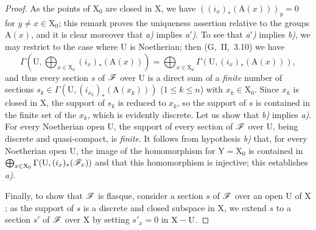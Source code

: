 \begin{proof}
As the points of $\mathrm{X}_0$ are closed in $\mathrm{X}$, we have $((i_x)_*(\mathrm{A}(x)))_y=0$ for $y\neq x\in\mathrm{X}_0$;
this remark proves the uniqueness assertion relative to the groups $\mathrm{A}(x)$, and it is clear moreover that \emph{a)} implies \emph{a$'$)}.
To see that \emph{a$'$)} implies \emph{b)}, we may restrict to the case where $\mathrm{U}$ is Noetherian;
then (G,~II,~3.10) we have
\[
  \Gamma(\mathrm{U},\bigoplus_{x\in\mathrm{X}_0}(i_x)_*(\mathrm{A}(x)))=\bigoplus_{x\in\mathrm{X}_0}\Gamma(\mathrm{U},(i_x)_*(\mathrm{A}(x))),
\]
and thus every section $s$ of $\mathscr{F}$ over $\mathrm{U}$ is a direct sum of a \emph{finite} number of sections $s_k\in\Gamma(\mathrm{U},(i_{x_k})_*(\mathrm{A}(x_k)))$ ($1\leq k\leq n$) with $x_k\in\mathrm{X}_0$.
Since $x_k$ is closed in $\mathrm{X}$, the support of $s_k$ is reduced to $x_k$, so the support of $s$ is contained in the finite set of the $x_k$, which is evidently discrete.
Let us show that \emph{b)} implies \emph{a)}.
For every Noetherian open $\mathrm{U}$, the support of every section of $\mathscr{F}$ over $\mathrm{U}$, being discrete and quasi-compact, is \emph{finite}.
It follows from hypothesis \emph{b)} that, for every Noetherian open $\mathrm{U}$, the image of the homomorphism  for $\mathrm{Y}=\mathrm{X}_0$ is contained in $\bigoplus_{x\in\mathrm{X}_0}\Gamma(\mathrm{U},(i_x)_*(\mathscr{F}_x))$ and that this homomorphism is injective; this establishes \emph{a)}.

Finally, to show that $\mathscr{F}$ is flasque, consider a section $s$ of $\mathscr{F}$ over an open $\mathrm{U}$ of $\mathrm{X}$;
as the support of $s$ is a discrete and closed subspace in $\mathrm{X}$, we extend $s$ to a section $s'$ of $\mathscr{F}$ over $\mathrm{X}$ by setting $s'_x=0$ in $\mathrm{X}-\mathrm{U}$.
\end{proof}

